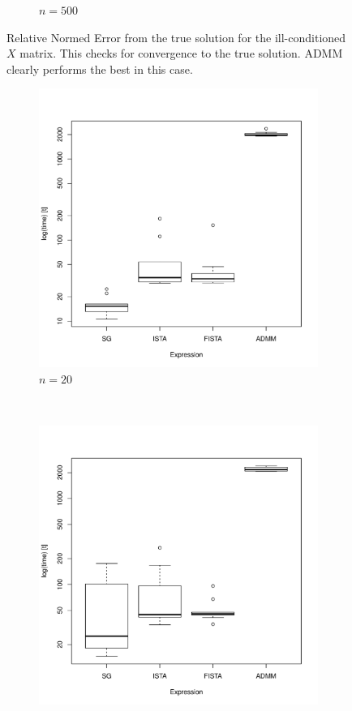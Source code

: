 \documentclass[12pt, leqno]{article}
\theoremstyle{remark}
\begin{document}
\begin{figure}[H]
\begin{subfigure}[b]{0.4\textwidth}
        \caption{$n=500$}
        \label{fig:500}
    \end{subfigure}
\caption{Relative Normed Error from the true solution for the ill-conditioned $X$ matrix. This checks for convergence to the true solution. ADMM clearly performs the best in this case.}
\label{fig:cvgc2cn}
\end{figure}

\begin{figure}[H]
  \centering
    \begin{subfigure}[b]{0.4\textwidth}
        \includegraphics[width=\textwidth]{20timing-cn.pdf}
        \caption{$n=20$}
        \label{fig:20}
    \end{subfigure}
~
    \begin{subfigure}[b]{0.4\textwidth}
        \includegraphics[width=\textwidth]{50timing-cn.pdf}

\end{subfigure}
\end{figure}
\end{document}
